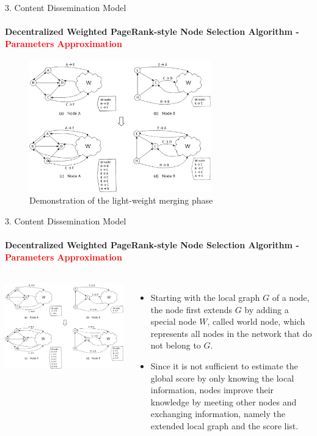\documentclass{beamer}		%
\begin{document}
\begin{frame}{3. Content Dissemination Model}
\framesubtitle{Decentralized Weighted PageRank-style Node Selection Algorithm - \textcolor{red}{Parameters Approximation}}
\begin{figure}
    \centering
    \includegraphics[width=0.7\textwidth]{imgs/Fig3.png}
    \caption{Demonstration of the light-weight merging phase}
\end{figure}
\end{frame}

\begin{frame}{3. Content Dissemination Model}
\framesubtitle{Decentralized Weighted PageRank-style Node Selection Algorithm - \textcolor{red}{Parameters Approximation}}
\begin{columns}
\includegraphics[scale=0.048]{imgs/Fig3.png}
\begin{itemize}
\item Starting with the local graph $G$ of a node, the node first extends $G$ by adding a special node $W$, called world node, which represents all nodes in the network that do not belong to $G$.
\item Since it is not sufficient to estimate the global score by only knowing the local information, nodes improve their knowledge by meeting other nodes and exchanging information, namely the extended local graph and the score list.
\end{itemize}
\end{columns}
\end{frame}
\end{document}
